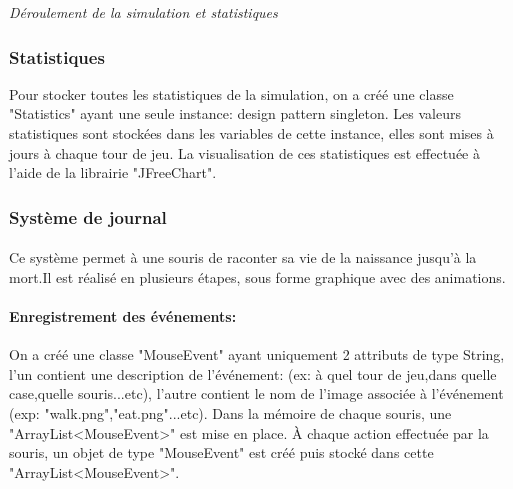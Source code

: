 \begin{center}


\vspace{1em}
\emph{Déroulement de la simulation et statistiques}
\end{center}

\subsubsection{Statistiques}
	Pour stocker toutes les statistiques de la simulation, on a créé une classe "Statistics" ayant une seule instance: design pattern singleton. Les valeurs statistiques sont stockées dans les variables de cette instance, elles sont mises à jours à chaque tour de jeu. La visualisation de ces statistiques est effectuée à l'aide de la librairie "JFreeChart".
\subsubsection{Système de journal}
\paragraph{}Ce système permet à une souris de raconter sa vie de la naissance jusqu'à la mort.Il est réalisé en plusieurs étapes, sous forme graphique avec des animations.
\paragraph{Enregistrement des événements:} On a créé une classe "MouseEvent" ayant uniquement 2 attributs de type String, l'un contient une description de l'événement: (ex: à quel tour de jeu,dans quelle case,quelle souris...etc), l'autre contient le nom de l'image associée à l'événement (exp: "walk.png","eat.png"...etc). Dans la mémoire de chaque souris, une "ArrayList<MouseEvent>" est mise en place. À chaque action effectuée par la souris, un objet de type "MouseEvent" est créé puis stocké dans cette "ArrayList<MouseEvent>".

